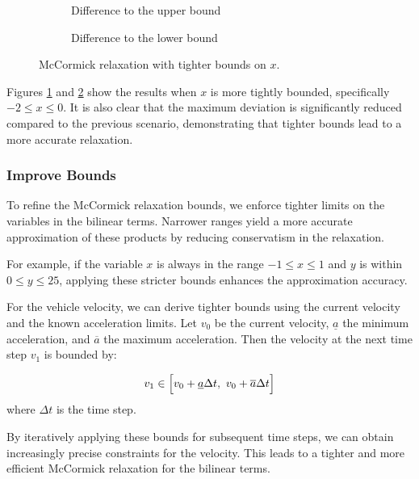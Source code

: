 \begin{figure}[h!]
	\centering
	\begin{subfigure}[b]{0.45\textwidth}
		\centering
		\resizebox{\textwidth}{!}{}
		\caption{Difference to the upper bound}
		\label{fig:mccormick_1_upper}
	\end{subfigure}
	\hfill
	\begin{subfigure}[b]{0.45\textwidth}
		\centering
		\resizebox{\textwidth}{!}{}
		\caption{Difference to the lower bound}
		\label{fig:mccormick_1_lower}
	\end{subfigure}
	\caption{McCormick relaxation with tighter bounds on $ x $.}
	\label{fig:mccormick_bounds_1}
\end{figure}
Figures \ref{fig:mccormick_1_upper} and \ref{fig:mccormick_1_lower} show the results when $ x $ is more tightly bounded, specifically $ -2 \leq x
	\leq 0 $.
It is also clear that the maximum deviation is significantly reduced compared to the previous scenario, demonstrating that tighter bounds lead to a
more accurate relaxation.

\subsubsection{Improve Bounds}

To refine the McCormick relaxation bounds, we enforce tighter limits on the variables in the bilinear terms.
Narrower ranges yield a more accurate approximation of these products by reducing conservatism in the relaxation.

For example, if the variable $ x $ is always in the range $-1 \leq x \leq 1$ and $ y $ is within $ 0 \leq y \leq 25 $, applying these stricter bounds
enhances the approximation accuracy.

For the vehicle velocity, we can derive tighter bounds using the current velocity and the known acceleration limits.
Let $ v_0 $ be the current velocity, $\underline{a}$ the minimum acceleration, and $\overline{a}$ the maximum acceleration.
Then the velocity at the next time step $ v_1 $ is bounded by:

\[ v_1 \in \Bigl[v_0 + \underline{a}\Delta t,\ v_0 +
		\overline{a}\Delta t\Bigr] \] where $ \Delta t $ is the time step.

By iteratively applying these bounds for subsequent time steps, we can obtain increasingly precise constraints for the velocity.
This leads to a tighter and more efficient McCormick relaxation for the bilinear terms.

